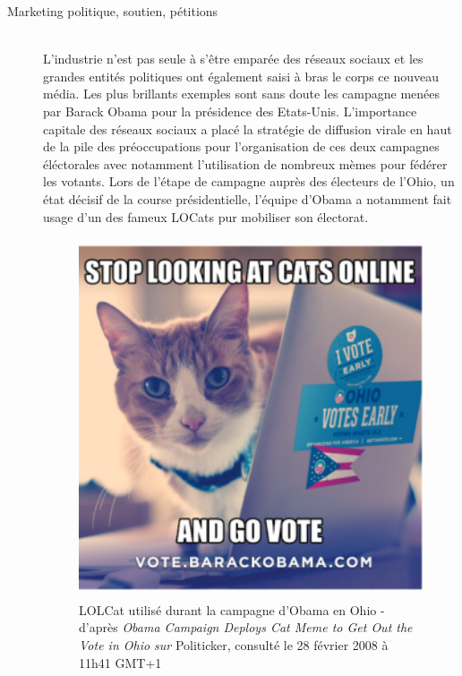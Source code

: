 \begin{description}
\item[Marketing politique, soutien, p\'etitions]
\hfill \\
L{\textquoteright}industrie n{\textquoteright}est pas seule \`a s{\textquoteright}\^etre empar\'ee des r\'eseaux sociaux et les grandes entit\'es politiques ont \'egalement saisi \`a bras le corps ce nouveau m\'edia. Les plus brillants exemples sont sans doute les campagne men\'ees par Barack Obama pour la pr\'esidence des Etats-Unis. L{\textquoteright}importance capitale des r\'eseaux sociaux a plac\'e la strat\'egie de diffusion virale en haut de la pile des pr\'eoccupations pour l{\textquoteright}organisation de ces deux campagnes \'el\'ectorales \cite{Miller2008} avec notamment l{\textquoteright}utilisation de nombreux m\`emes pour f\'ed\'erer les votants. Lors de l{\textquoteright}\'etape de campagne aupr\`es des \'electeurs de l{\textquoteright}Ohio, un \'etat d\'ecisif de la course pr\'esidentielle, l{\textquoteright}\'equipe d{\textquoteright}Obama a notamment fait usage d{\textquoteright}un des fameux LOCats pur mobiliser son \'electorat. 


\begin{figure}
    \centering
    \includegraphics[width=4.1669in,height=4.178in]{figures/chap2/chapitre2-img16.png}
    \caption[Lolcat utilisé lors la campagne d'Obama]{ 
        LOLCat utilis\'e durant la campagne d{\textquoteright}Obama en Ohio - d{\textquoteright}apr\`es \textit{Obama Campaign Deploys Cat Meme to Get Out the Vote in Ohio sur }Politicker, consult\'e le 28 f\'evrier 2008 \`a 11h41 GMT+1
    } 
    \label{fig:obama-cat}
\end{figure}


\end{description}
